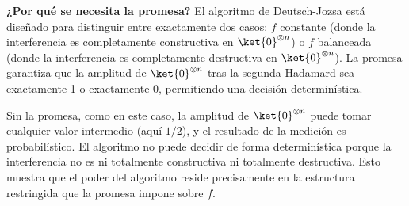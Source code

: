 \textbf{¿Por qué se necesita la promesa?} El algoritmo de Deutsch-Jozsa está diseñado para distinguir entre exactamente dos casos: $f$ constante (donde la interferencia es completamente constructiva en $\ket{0}^{\otimes n}$) o $f$ balanceada (donde la interferencia es completamente destructiva en $\ket{0}^{\otimes n}$). La promesa garantiza que la amplitud de $\ket{0}^{\otimes n}$ tras la segunda Hadamard sea exactamente 1 o exactamente 0, permitiendo una decisión determinística.

Sin la promesa, como en este caso, la amplitud de $\ket{0}^{\otimes n}$ puede tomar cualquier valor intermedio (aquí $1/2$), y el resultado de la medición es probabilístico. El algoritmo no puede decidir de forma determinística porque la interferencia no es ni totalmente constructiva ni totalmente destructiva. Esto muestra que el poder del algoritmo reside precisamente en la estructura restringida que la promesa impone sobre $f$.

\vspace{1cm}
